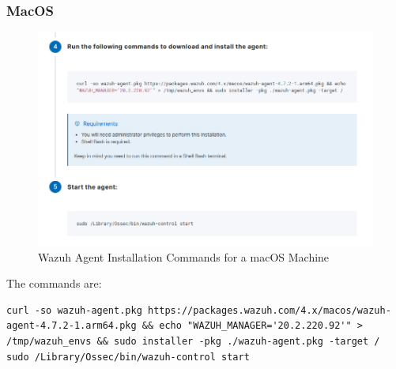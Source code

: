 \begin{itemize}
    \subsubsection{MacOS}
    \begin{figure}[H]
      \centering
      \includegraphics[width=\textwidth]{images/setup/wazuh-agent-commands-mac.png}
      \caption{Wazuh Agent Installation Commands for a macOS Machine}
    \end{figure}
    The commands are:
    \begin{verbatim}
curl -so wazuh-agent.pkg https://packages.wazuh.com/4.x/macos/wazuh-agent-4.7.2-1.arm64.pkg && echo "WAZUH_MANAGER='20.2.220.92'" > /tmp/wazuh_envs && sudo installer -pkg ./wazuh-agent.pkg -target /
sudo /Library/Ossec/bin/wazuh-control start
    \end{verbatim}


\end{itemize}
